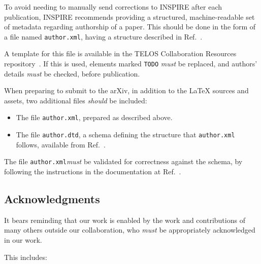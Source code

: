 \documentclass{article}
\newcommand\rfcword[1]{\emph{#1}\xspace}
\newcommand\must{\rfcword{must}}
\newcommand\should{\rfcword{should}}
\newcommand\filename[1]{\texttt{#1}\xspace}
\newcommand\authorxml{\filename{author.xml}}
\begin{document}
To avoid needing to manually send corrections to INSPIRE after each publication,
INSPIRE recommends providing
a structured, machine-readable set of metadata regarding authorship of a paper.
This should be done in the form of a file named \authorxml,
having a structure described in Ref.~\cite{inspire-authorxml}.

A template for this file is available in the TELOS Collaboration Resources repository~\cite{resources}.
If this is used,
elements marked \verb|TODO| \must be replaced,
and authors' details \must be checked,
before publication.

When preparing to submit to the arXiv,
in addition to the LaTeX sources and assets,
two additional files \should be included:

\begin{itemize}
  \item
        The file \authorxml,
        prepared as described above.
  \item
        The file \filename{author.dtd},
        a schema defining the structure that \authorxml follows,
        available from Ref.~\cite{inspire-authorxml}.
\end{itemize}

The file \authorxml \must be validated for correctness against the schema,
by following the instructions in the documentation at Ref.~\cite{inspire-authorxml}.

\subsection{Acknowledgments}\label{sec:acknowledge}

It bears reminding that our work is enabled by
the work and contributions of many others outside our collaboration,
who \must be appropriately acknowledged in our work.

This includes:
\end{document}
